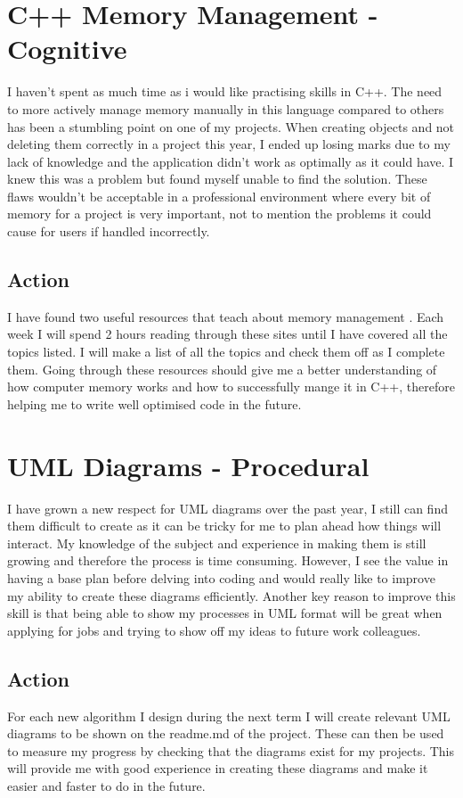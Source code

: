 \documentclass{scrartcl}
\begin{document}
\section{C++ Memory Management - Cognitive}
I haven't spent as much time as i would like practising skills in C++. The need to more actively manage memory manually in this language compared to others has been a stumbling point on one of my projects. When creating objects and not deleting them correctly in a project this year, I ended up losing marks due to my lack of knowledge and the application didn't work as optimally as it could have. I knew this was a problem but found myself unable to find the solution.
These flaws wouldn't be acceptable in a professional environment where every bit of memory for a project is very important, not to mention the problems it could cause for users if handled incorrectly. 
\subsection{Action}
I have found two useful resources that teach about memory management \cite{c++programming/memorymanagement} \cite{whateveryprogrammershouldknowaboutmemory}. Each week I will spend 2 hours reading through these sites until I have covered all the topics listed. I will make a list of all the topics and check them off as I complete them. Going through these resources should give me a better understanding of how computer memory works and how to successfully mange it in C++, therefore helping me to write well optimised code in the future.

\section{UML Diagrams - Procedural}
I have grown a new respect for UML diagrams over the past year, I still can find them difficult to create as it can be tricky for me to plan ahead how things will interact. My knowledge of the subject and experience in making them is still growing and therefore the process is time consuming. However, I see the value in having a base plan before delving into coding and would really like to improve my ability to create these diagrams efficiently. Another key reason to improve this skill is that being able to show my processes in UML format will be great when applying for jobs and trying to show off my ideas to future work colleagues.
\subsection{Action}
For each new algorithm I design during the next term I will create relevant UML diagrams to be shown on the readme.md of the project. These can then be used to measure my progress by checking that the diagrams exist for my projects. This will provide me with good experience in creating these diagrams and make it easier and faster to do in the future.
\end{document}
